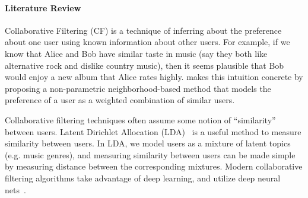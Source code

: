 \documentclass{article}
\begin{document}
\paragraph*{Literature Review}
Collaborative Filtering (CF) is a technique of inferring about the preference
 about one user using known information about other users.
For example, if we know that Alice and Bob have similar taste in music (say
 they both like alternative rock and dislike country music), then it seems
 plausible that Bob would enjoy a new album that Alice rates highly.
\citet{herlockerAlgorithmicFrameworkPerforming1999} makes this intuition
 concrete by proposing a non-parametric neighborhood-based method that models
 the preference of a user as a weighted combination of similar users.

Collaborative filtering techniques often assume some notion of ``similarity''
 between users.
Latent Dirichlet Allocation (LDA)~\citep{bleiLatentDirichletAllocation2001} is
 a useful method to measure similarity between users.
In LDA, we model users as a mixture of latent topics (e.g. music genres), and
 measuring similarity between users can be made simple by measuring distance
 between the corresponding mixtures.
Modern collaborative filtering algorithms take advantage of deep learning, and
 utilize deep neural nets~\citep{Anelli_2022}.



\end{document}
